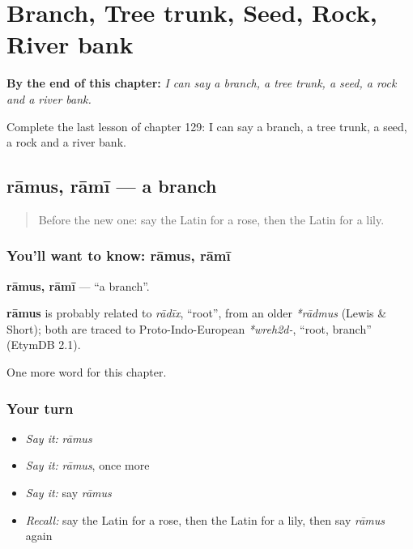 
\chapter{Branch, Tree trunk, Seed, Rock, River bank}
\label{ch:la-branch-tree-trunk-seed-rock-river-bank}

\begin{chapteropening}
\textbf{By the end of this chapter:} \emph{I can say a branch, a tree trunk, a seed, a rock and a river bank.}

Complete the last lesson of chapter 129: I can say a branch, a tree trunk, a seed, a rock and a river bank.
\end{chapteropening}

\section[rāmus, rāmī]{rāmus, rāmī — a branch}

\label{lesson:LA-C129-ramus}



\begin{quote}
Before the new one: say the Latin for a rose, then the Latin for a lily.
\end{quote}

\subsection*{You'll want to know: rāmus, rāmī}
\textbf{rāmus, rāmī} — \textquotedblleft{}a branch\textquotedblright{}.

\begin{cousinweb}
\textbf{rāmus} is probably related to \emph{rādīx}, \textquotedblleft{}root\textquotedblright{}, from an older \emph{*rādmus} (Lewis \& Short); both are traced to Proto-Indo-European \emph{*wreh2d-}, \textquotedblleft{}root, branch\textquotedblright{} (EtymDB 2.1).
\end{cousinweb}

\begin{grammarlens}[title={What you've built}]
One more word for this chapter.
\end{grammarlens}

\subsection*{Your turn}
\begin{itemize}
\raggedright
  \item \emph{Say it:} \emph{rāmus}
  \item \emph{Say it:} \emph{rāmus}, once more
  \item \emph{Say it:} say \emph{rāmus}
  \item \emph{Recall:} say the Latin for a rose, then the Latin for a lily, then say \emph{rāmus} again
\end{itemize}

